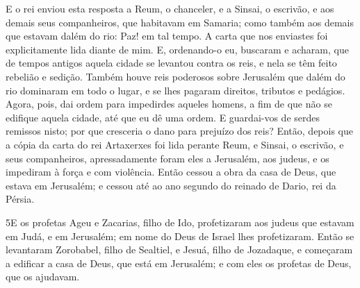 E o rei enviou esta resposta a Reum, o chanceler, e a Sinsai, o
escrivão, e aos demais seus companheiros, que habitavam em Samaria;
como também aos demais que estavam dalém do rio: Paz! em tal tempo.
A carta que nos enviastes foi explicitamente lida diante de
mim. E, ordenando-o eu, buscaram e acharam, que de tempos
antigos aquela cidade se levantou contra os reis, e nela se têm
feito rebelião e sedição. Também houve reis poderosos sobre
Jerusalém que dalém do rio dominaram em todo o lugar, e se lhes
pagaram direitos, tributos e pedágios. Agora, pois, dai ordem
para impedirdes aqueles homens, a fim de que não se edifique aquela
cidade, até que eu dê uma ordem. E guardai-vos de serdes
remissos nisto; por que cresceria o dano para prejuízo dos reis?
Então, depois que a cópia da carta do rei Artaxerxes foi lida
perante Reum, e Sinsai, o escrivão, e seus companheiros,
apressadamente foram eles a Jerusalém, aos judeus, e os impediram à
força e com violência. Então cessou a obra da casa de Deus,
que estava em Jerusalém; e cessou até ao ano segundo do reinado de
Dario, rei da Pérsia.

\medskip

\lettrine{5} E os profetas Ageu e Zacarias, filho de Ido,
profetizaram aos judeus que estavam em Judá, e em Jerusalém; em nome
do Deus de Israel lhes profetizaram. Então se levantaram
Zorobabel, filho de Sealtiel, e Jesuá, filho de Jozadaque, e
começaram a edificar a casa de Deus, que está em Jerusalém; e com
eles os profetas de Deus, que os ajudavam.

